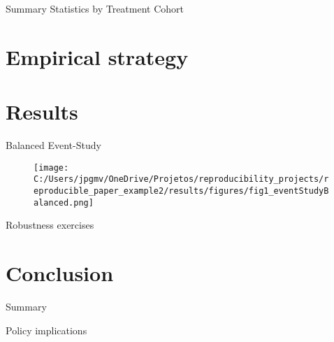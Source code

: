 \documentclass[
  ignorenonframetext,
  aspectratio=169]{beamer}
\begin{document}
\begin{frame}{Summary Statistics by Treatment Cohort}
\protect\hypertarget{summary-statistics-by-treatment-cohort}{}
\vspace{-0.5cm}

\begin{table}[H]
\scalebox{0.6}{
    
}
\label{tab:summaryStat}
\end{table}
\end{frame}

\hypertarget{empirical-strategy}{%
\section{Empirical strategy}\label{empirical-strategy}}

\hypertarget{results}{%
\section{Results}\label{results}}

\begin{frame}{Balanced Event-Study
\hyperlink{unbalanced}{}}
\protect\hypertarget{balanced-event-study}{}
\label{balanced}

\begin{figure}
  \texttt{[image: C:/Users/jpgmv/OneDrive/Projetos/reproducibility\_projects/reproducible\_paper\_example2/results/figures/fig1\_eventStudyBalanced.png]}
\end{figure}
\end{frame}

\begin{frame}{Robustness exercises}
\protect\hypertarget{robustness-exercises}{}
\label{robustness}
\end{frame}

\hypertarget{conclusion}{%
\section{Conclusion}\label{conclusion}}

\begin{frame}{Summary}
\protect\hypertarget{summary}{}
\label{conclusion}
\end{frame}

\begin{frame}{Policy implications}
\protect\hypertarget{policy-implications}{}
\setcounter{finalframe}{\value{framenumber}}
\end{frame}
\end{document}
